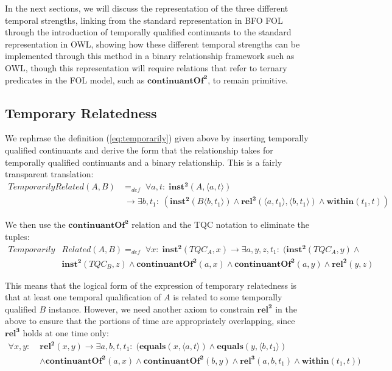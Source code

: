 \documentclass[10pt]{bmc_article}
\newcommand{\mirel}[1]{\ensuremath{\mathrm{\mathbf{#1}}}}
\newcommand{\mclass}[1]{\ensuremath{\mathit{#1}}}
\newcommand{\mrel}[2]{\mirel{#1^#2}}
\newcommand{\mrelb}[1]{\mrel{#1}{2}}
\newcommand{\mrelt}[1]{\mrel{#1}{3}}
\newcommand{\pair}[2]{\ensuremath{\langle #1,#2\rangle}}
\newcommand{\TQC}[1]{\ensuremath{TQC_{\mclass{#1}}}}
\newenvironment{bmcformat}{\baselineskip20pt\sloppy\setboolean{publ}{false}}{\baselineskip20pt\sloppy}
\begin{document}
\begin{bmcformat}
In the next sections, we will discuss the representation of the three different
temporal strengths, linking from the standard representation in BFO FOL through
the introduction of temporally qualified continuants to the standard
representation in OWL, showing how these different temporal strengths can be
implemented through this method in a binary relationship framework such as OWL,
though this representation will require relations that refer to ternary
predicates in the FOL model, such as \mrelb{continuantOf}, to remain primitive.

\subsection*{Temporary Relatedness}

We rephrase the definition (\ref{eq:temporarily}) given above by inserting
temporally qualified continuants and derive the form that the relationship takes
for temporally qualified continuants and a binary relationship. This is a fairly
transparent translation:
\begin{equation}
\begin{split}
\mclass{TemporarilyRelated}(\mclass{A},\mclass{B})& =_{def}\;
\forall a, t:\; \mrelb{inst}(\mclass{A}, \pair{a}{t}) \\
&\ \rightarrow
\exists b, t_1:\;(\mrelb{inst}(\mclass{B}\pair{b}{t_1}) \wedge
\mrelb{rel}(\pair{a}{t_1},\pair{b}{t_1}) \wedge \mirel{within}(t_1,t))
\end{split}
\end{equation}

We then use the \mrelb{continuantOf} relation and the TQC notation to eliminate
the tuples:
\begin{equation}
\begin{split}
\mclass{Temporarily}&\mclass{Related}(\mclass{A},\mclass{B}) =_{def}\;
\forall x:\; \mrelb{inst}(\TQC{A}, x)
 \rightarrow
\exists a,y,z,t_1:\;(\mrelb{inst}(\TQC{A},y) \wedge \\ & \mrelb{inst}(\TQC{B},z) 
 \wedge \mrelb{continuantOf}(a,x) \wedge \mrelb{continuantOf}(a,y) \wedge
\mrelb{rel}(y,z) 
\end{split}
\label{eq:usesSame}
\end{equation}

This means that the logical form of the expression of temporary relatedness is that
at least one temporal qualification of \mclass{A} is related to some temporally
qualified \mclass{B} instance.
However, we need another axiom to constrain \mrelb{rel} in the above to ensure that the
portions of time are appropriately overlapping, since \mrelt{rel} holds at one time
only:
\begin{equation}
\begin{split}
\forall x,y:\;& \mrelb{rel}(x,y) \rightarrow \exists a,b,t,t_1:\;
(\mirel{equals}(x,\pair{a}{t})\wedge \mirel{equals}(y,\pair{b}{t_1})\\ 
& \wedge \mrelb{continuantOf}(a,x) \wedge \mrelb{continuantOf}(b,y) \wedge
\mrelt{rel}(a,b,t_1) \wedge \mirel{within}(t_1,t))
\end{split}
\end{equation}


\end{bmcformat}
\end{document}

